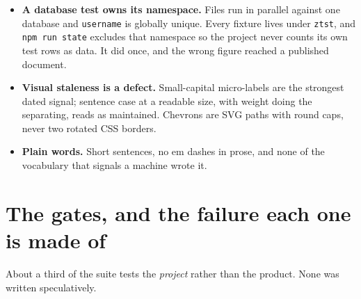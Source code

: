 \documentclass[11pt,a4paper]{article}
\begin{document}
\begin{itemize}[leftmargin=*]
        \texttt{main} already behind, and the symptom arrives later wearing a
        different face, a push reporting a new branch for one that was deleted
        on merge and now holds work in no pull request.
  \item \textbf{A database test owns its namespace.} Files run in parallel
        against one database and \texttt{username} is globally unique. Every
        fixture lives under \texttt{ztst}, and \texttt{npm run state} excludes
        that namespace so the project never counts its own test rows as data.
        It did once, and the wrong figure reached a published document.
  \item \textbf{Visual staleness is a defect.} Small-capital micro-labels are
        the strongest dated signal; sentence case at a readable size, with
        weight doing the separating, reads as maintained. Chevrons are SVG
        paths with round caps, never two rotated CSS borders.
  \item \textbf{Plain words.} Short sentences, no em dashes in prose, and none
        of the vocabulary that signals a machine wrote it.
\end{itemize}

\section{The gates, and the failure each one is made of}

About a third of the suite tests the \emph{project} rather than the product.
None was written speculatively.
\end{document}
